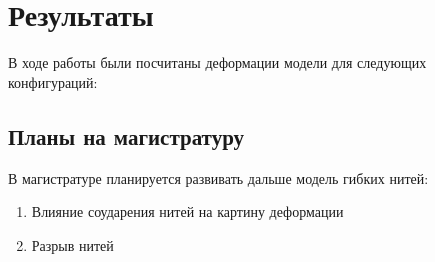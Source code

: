 \chapter{Результаты}\label{ch:results}
В ходе работы были посчитаны деформации модели для следующих конфигураций:


\section*{Планы на магистратуру}
В магистратуре планируется развивать дальше модель гибких нитей:

\begin{enumerate}
    \item Влияние соударения нитей на картину деформации
    \item Разрыв нитей
\end{enumerate}